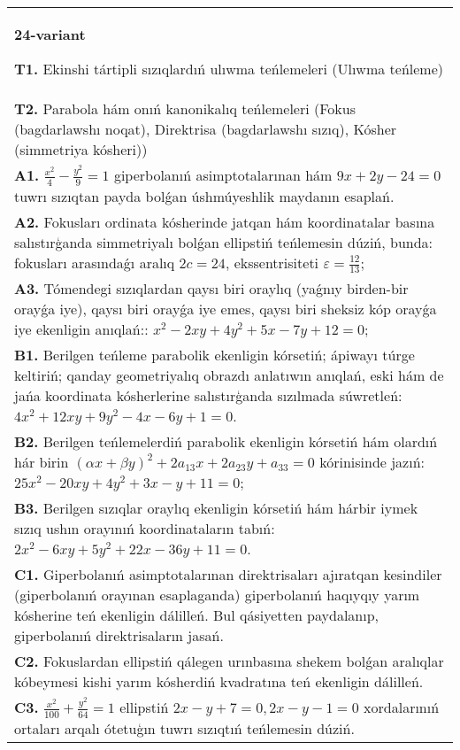 \documentclass{article}
\begin{document}
\begin{tabular}{m{17cm}}
\textbf{24-variant}
\newline

\textbf{T1.} Ekinshi tártipli sızıqlardıń ulıwma teńlemeleri (Ulıwma teńleme) \\
\textbf{T2.} Parabola hám onıń kanonikalıq teńlemeleri (Fokus (bagdarlawshı noqat), Direktrisa (bagdarlawshı sızıq), Kósher (simmetriya kósheri)) \\
\textbf{A1.} $\frac{x^2}{4}-\frac{y^2}{9}=1$ giperbolanıń asimptotalarınan hám $9 x+2 y-24=0$ tuwrı sızıqtan payda bolǵan úshmúyeshlik maydanın esaplań. \\
\textbf{A2.} Fokusları ordinata kósherinde jatqan hám koordinatalar basına salıstırģanda simmetriyalı bolǵan ellipstiń teńlemesin dúziń, bunda: fokusları arasındaǵı aralıq $2 c=24$, ekssentrisiteti $\varepsilon=\frac{12}{13}$; \\
\textbf{A3.} Tómendegi sızıqlardan qaysı biri oraylıq (yaǵnıy birden-bir orayǵa iye), qaysı biri orayǵa iye emes, qaysı biri sheksiz kóp orayǵa iye ekenligin anıqlań:: $x^2-2 x y+4 y^2+5 x-7 y+12=0$; \\
\textbf{B1.} Berilgen teńleme parabolik ekenligin kórsetiń; ápiwayı túrge keltiriń; qanday geometriyalıq obrazdı anlatıwın anıqlań, eski hám de jańa koordinata kósherlerine salıstırģanda sızılmada súwretleń:$4 x^2+12 x y+9 y^2-4 x-6 y+1=0$. \\
\textbf{B2.} Berilgen teńlemelerdiń parabolik ekenligin kórsetiń hám olardıń hár birin $(\alpha x+\beta y)^2+2 a_{13} x+2 a_{23} y+a_{33}=0$ kórinisinde jazıń: $25 x^2-20 x y+4 y^2+3 x-y+11=0$; \\
\textbf{B3.} Berilgen sızıqlar oraylıq ekenligin kórsetiń hám hárbir iymek sızıq ushın orayınıń koordinataların tabıń: $2 x^2-6 x y+5 y^2+22 x-36 y+11=0$. \\
\textbf{C1.} Giperbolanıń asimptotalarınan direktrisaları ajıratqan kesindiler (giperbolanıń orayınan esaplaganda) giperbolanıń haqıyqıy yarım kósherine teń ekenligin dálilleń. Bul qásiyetten paydalanıp, giperbolanıń direktrisaların jasań. \\
\textbf{C2.} Fokuslardan ellipstiń qálegen urınbasına shekem bolǵan aralıqlar kóbeymesi kishi yarım kósherdiń kvadratına teń ekenligin dálilleń. \\
\textbf{C3.} $\frac{x^2}{100}+\frac{y^2}{64}=1$ ellipstiń $2 x-y+7=0,2 x-y-1=0$ xordalarınıń ortaları arqalı ótetuģın tuwrı sızıqtıń teńlemesin dúziń. \\

\end{tabular}
\vspace{1cm}
\end{document}
